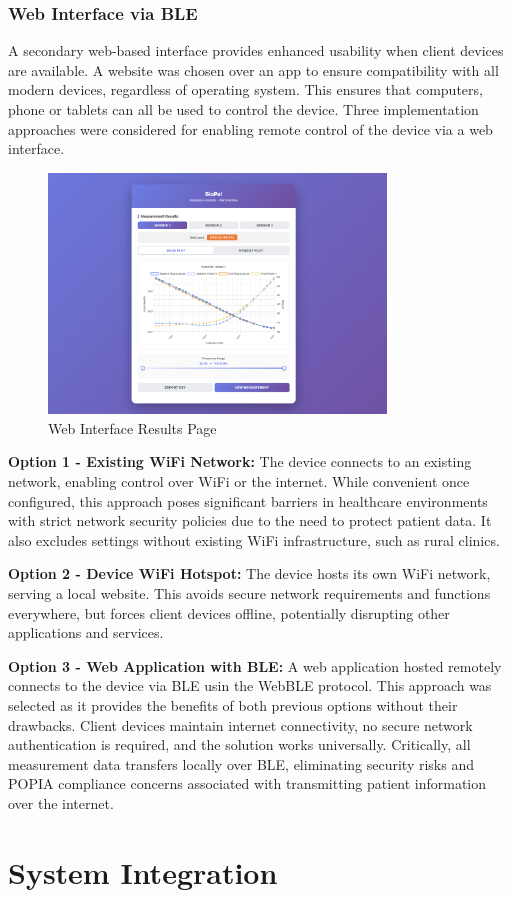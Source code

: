 \subsubsection{Web Interface via BLE}
A secondary web-based interface provides enhanced usability when client devices are available. A website was chosen over an app to ensure compatibility with all modern devices, regardless of operating system. This ensures that computers, phone or tablets can all be used to control the device. Three implementation approaches were considered for enabling remote control of the device via a web interface.

\begin{figure}[H]
    \centering
    \includegraphics[width=0.8\textwidth]{BioPal WebUI.png}
    \caption{Web Interface Results Page}
    \label{fig:web_ui_results}
\end{figure}

\textbf{Option 1 - Existing WiFi Network:} The device connects to an existing network, enabling control over WiFi or the internet. While convenient once configured, this approach poses significant barriers in healthcare environments with strict network security policies due to the need to protect patient data. It also excludes settings without existing WiFi infrastructure, such as rural clinics.

\textbf{Option 2 - Device WiFi Hotspot:} The device hosts its own WiFi network, serving a local website. This avoids secure network requirements and functions everywhere, but forces client devices offline, potentially disrupting other applications and services.

\textbf{Option 3 - Web Application with BLE:} A web application hosted remotely connects to the device via \ac{BLE} usin the WebBLE protocol. This approach was selected as it provides the benefits of both previous options without their drawbacks. Client devices maintain internet connectivity, no secure network authentication is required, and the solution works universally. Critically, all measurement data transfers locally over \ac{BLE}, eliminating security risks and POPIA compliance concerns associated with transmitting patient information over the internet.

\section{System Integration}

\label{chap:design}
